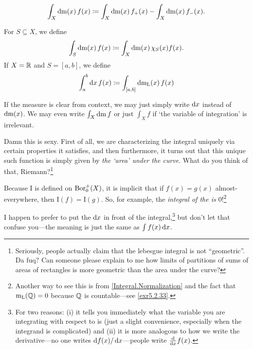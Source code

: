 \begin{thm}[Integral]
\begin{rmk}
\begin{equation}
\int _X\mathop{}\!\mathrm{d} \mathrm{m} (x)\, f(x)\coloneqq \int _X\mathop{}\!\mathrm{d} \mathrm{m} (x)\, f_+(x)-\int _X\mathop{}\!\mathrm{d} \mathrm{m} (x)\, f_-(x).
\end{equation}
\end{rmk}
\begin{rmk}
For $S\subseteq X$, we define
\begin{equation}
\int _S\mathop{}\!\mathrm{d} \mathrm{m} (x)\, f(x)\coloneqq \int _X\mathop{}\!\mathrm{d} \mathrm{m} (x)\, \chi _S(x)f(x).
\end{equation}
If $X=\mathbb{R}$ and $S=[a,b]$, we define
\begin{equation}
\int _a^b\mathop{}\!\mathrm{d} x\, f(x)\coloneqq \int _{[a,b]}\mathop{}\!\mathrm{d} \mathrm{m} _{\mathrm{L}}(x)\, f(x)
\end{equation}
\end{rmk}
\begin{rmk}
If the measure is clear from context, we may just simply write $\mathop{}\!\mathrm{d} x$ instead of $\mathop{}\!\mathrm{d} \mathrm{m} (x)$.  We may even write $\int _X\mathop{}\!\mathrm{d} \mathrm{m} \, f$ or just $\int _Xf$ if `the variable of integration' is irrelevant.
\end{rmk}
\begin{rmk}
Damn this is sexy.  First of all, we are characterizing the integral uniquely via certain properties it satisfies, and then furthermore, it turns out that this unique such function is simply given by \emph{the `area' under the curve}.  What do you think of that, Riemann?\footnote{Seriously, people actually claim that the lebesgue integral is not ``geometric''.  Da fuq?  Can someone please explain to me how limits of partitions of sums of areas of rectangles is more geometric than the area under the curve?}
\end{rmk}
\begin{rmk}
Because $\mathrm{I}$ is defined on $\operatorname{Bor} _0^+(X)$, it is implicit that if $f(x)=g(x)$ almost-everywhere, then $\mathrm{I}(f)=\mathrm{I}(g)$.  So, for example, the \emph{integral of the  is $0$}!\footnote{Another way to see this is from \ref{Integral.Normalization} and the fact that $\mathrm{m} _{\mathrm{L}}(\mathbb{Q} )=0$ because $\mathbb{Q}$ is countable---see \cref{exr5.2.33}.}
\end{rmk}
\begin{rmk}
I happen to prefer to put the $\mathop{}\!\mathrm{d} x$ in front of the integral,\footnote{For two reasons:  (i) it tells you immediately what the variable you are integrating with respect to is (just a slight convenience, especially when the integrand is complicated) and (ii) it is more analogous to how we write the derivative---no one writes $\mathop{}\!\mathrm{d} f(x)/\mathop{}\!\mathrm{d} x$---people write $\frac{\mathop{}\!\mathrm{d}}{\mathop{}\!\mathrm{d} x}f(x)$.} but don't let that confuse you---the meaning is just the same as $\int f(x)\mathop{}\!\mathrm{d} x$.

\end{rmk}
\end{thm}
